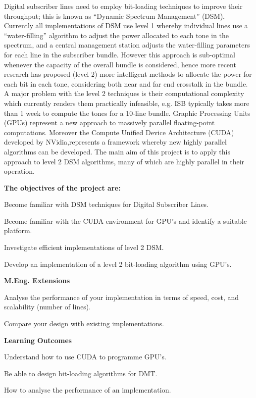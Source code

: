 Digital subscriber lines need to employ bit-loading techniques to improve their throughput; this is known as “Dynamic Spectrum Management” (DSM). Currently all implementations of DSM use level 1 whereby individual lines use a “water-filling” algorithm to adjust the power allocated to each tone in the spectrum, and a central management station adjusts the water-filling parameters for each line in the subscriber bundle. However this approach is sub-optimal whenever the capacity of the overall bundle is considered, hence more recent research has proposed (level 2) more intelligent methods to allocate the power for each bit in each tone, considering both near and far end crosstalk in the bundle.
A major problem with the level 2 techniques is their computational complexity which currently renders them practically infeasible, e.g. ISB typically takes more than 1 week to compute the tones for a 10-line bundle. Graphic Processing Units (GPUs) represent a new approach to massively parallel floating-point computations. Moreover the Compute Unified Device Architecture (CUDA) developed by NVidia,represents a framework whereby new highly parallel algorithms can be developed. The main aim of this project is to apply this approach to level 2 DSM algorithms, many of which are highly parallel in their operation.

\textbf{The objectives of the project are:}
\begin{enumerate*}
 \item Become familiar with DSM techniques for Digital Subscriber Lines.
 \item Become familiar with the CUDA environment for GPU's and identify a suitable platform.
 \item Investigate efficient implementations of level 2 DSM.
 \item Develop an implementation of a level 2 bit-loading algorithm using GPU's.
\end{enumerate*}

\textbf{M.Eng. Extensions}
\begin{enumerate*}
 \item Analyse the performance of your implementation in terms of speed, cost, and scalability (number of lines).
 \item Compare your design with existing implementations.
\end{enumerate*}

\textbf{Learning Outcomes}
\begin{enumerate*}
 \item Understand how to use CUDA to programme GPU's.
 \item Be able to design bit-loading algorithms for DMT.
 \item How to analyse the performance of an implementation.
\end{enumerate*}

